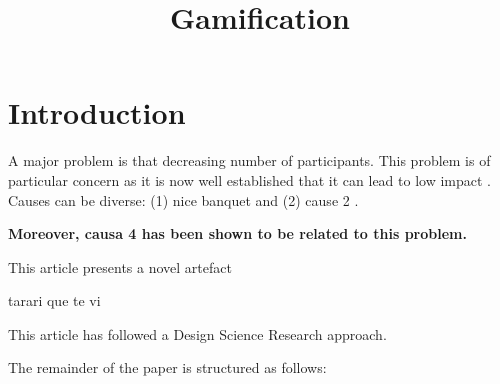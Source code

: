 \documentclass{article}
\title{Gamification}
\author{}
\newcommand{\todo}[1] {\iffalse #1 \fi} %
\begin{document}
\maketitle
      

\section{Introduction}


    
A major problem is that decreasing number of participants. This problem is of particular concern as it is now well established that it can lead to low impact \cite{Hamari2014} \cite{Hamari2014} \cite{Hamari2014} \cite{Hamari2014}. Causes can be diverse: (1) nice banquet \cite{Hamari2014} and (2) cause 2 \cite{Liu2017}.
\todo{que no se nos olvide considerar las causa 5}
    
\textbf{ Moreover, causa 4 has been shown to be related to this problem. }%

    

    
This article presents a novel artefact
    
tarari que te vi \todo{poner bibliografia}

    

      
This article has followed a Design Science Research approach.

The remainder of the paper is structured as follows: 

    
      


\end{document}
